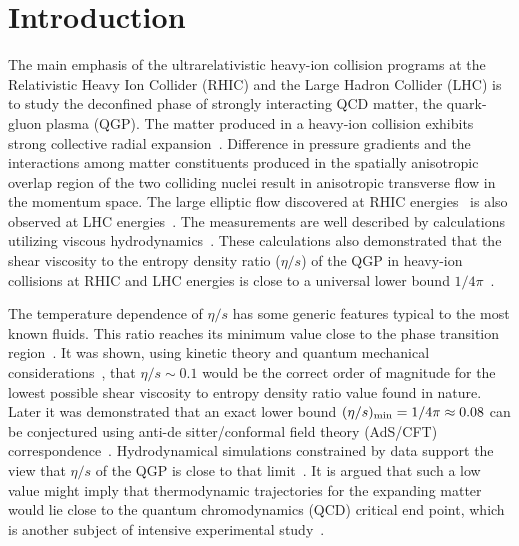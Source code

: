 
\section{Introduction}
\label{sec:intro}
The main emphasis of the ultrarelativistic heavy-ion collision programs at the Relativistic Heavy Ion Collider (RHIC) and the Large Hadron Collider (LHC) is to study the deconfined phase of strongly interacting QCD matter, the quark-gluon plasma (QGP). 
The matter produced in a heavy-ion collision exhibits strong collective radial expansion~\cite{PhysRevD.34.794,Heinz:2013th}. 
Difference in pressure gradients and the interactions among matter constituents produced in the spatially anisotropic overlap region of the two colliding nuclei result in anisotropic transverse flow in the momentum space.
The large elliptic flow discovered at RHIC energies~\cite{Ackermann:2000tr,Adams:2005dq,Adcox:2004mh,Arsene:2004fa,Back:2004je} is also observed at LHC energies~\cite{Aamodt:2010pa,ALICE:2011ab,Abelev:2014pua,Adam:2016izf,ATLAS:2011ah,ATLAS:2012at,Aad:2013xma,Aad:2014eoa,Chatrchyan:2012wg,Chatrchyan:2012ta,Chatrchyan:2012xq}. The measurements are well described by calculations utilizing viscous hydrodynamics~\cite{Romatschke:2007mq,Shen:2011eg,Schenke:2011zz,Bozek:2012qs,Gale:2012rq,Hirano:2010je}.
These calculations also demonstrated that the shear viscosity to the entropy density ratio ($\eta/s$) of the QGP in heavy-ion collisions at RHIC and LHC energies is close to a universal lower bound $1/4\pi$~\cite{Kovtun:2004de}.

The temperature dependence of $\eta/s$ has some generic features typical to the most known fluids. This ratio reaches its minimum value close to the phase transition region~\cite{Kovtun:2004de,Lacey:2006bc}.
It was shown, using kinetic theory and quantum mechanical considerations~\cite{PhysRevD.31.53}, that $\eta/s\sim0.1$ would be the correct order of magnitude for the lowest possible shear viscosity to entropy density ratio value found in nature. Later it was demonstrated that an exact lower bound $(\eta/s)_{\rm min}=1/4\pi\approx0.08$ can be conjectured using anti-de sitter/conformal field theory (AdS/CFT) correspondence~\cite{Kovtun:2004de}. Hydrodynamical simulations constrained by data support the view that $\eta/s$ of the QGP is close to that limit~\cite{Gale:2012rq}.
It is argued that such a low value might imply that thermodynamic trajectories for the expanding matter would lie close to the quantum chromodynamics (QCD) critical end point, which is another subject of intensive experimental study~\cite{Lacey:2006bc,Csernai:2006zz}.

